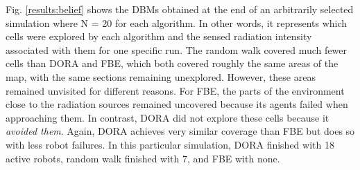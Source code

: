\documentclass[letterpaper, 10 pt, conference]{ieeeconf}
\begin{document}
Fig. \ref{results:belief} shows the DBMs obtained at the end of an
arbitrarily selected simulation where N = 20 for each algorithm.  In
other words, it represents which cells were explored by each algorithm
and the sensed radiation intensity associated with them for one specific run. The random
walk covered much fewer cells than DORA and FBE, which both covered
roughly the same areas of the map, with the same sections remaining
unexplored. However, these areas remained unvisited for different
reasons. For FBE, the parts of the environment close to the radiation
sources remained uncovered because its agents failed when approaching
them. In contrast, DORA did not explore these cells because it
\textit{avoided them}. Again, DORA achieves very similar coverage than
FBE but does so with less robot failures. In this particular
simulation, DORA finished with 18 active robots, random walk finished
with 7, and FBE with none.
\end{document}
